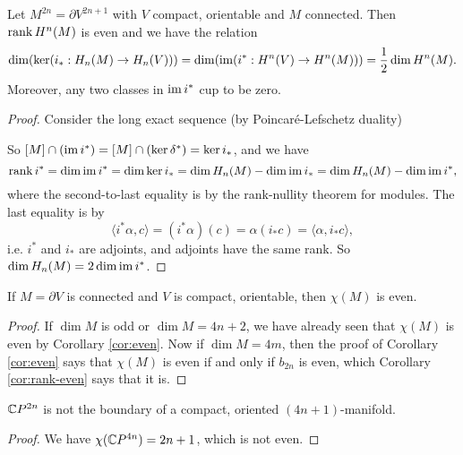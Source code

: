 \begin{corollary}\label{cor:rank-even}
  Let $M^{2n} = \partial V^{2n + 1}$ with
  $V$ compact, orientable and $M$ connected.
  Then $\operatorname{rank} H^n(M)$ is even and we have
  the relation
  \[
    \dim (\ker (i_* : H_n(M) \to H_n(V)))
    = \dim (\operatorname{im} (i^* : H^n(V) \to H^n(M)))
    = \frac{1}{2} \dim H^n(M).
  \]
  Moreover, any two classes in
  $\operatorname{im} i^*$ cup to be zero.
\end{corollary}

\begin{proof}
  Consider the long exact sequence (by
  Poincar\'e-Lefschetz duality)
  \begin{center}
  \end{center}
  So $[M] \cap (\operatorname{im} i^*) = [M] \cap (\ker \delta^*) = \ker i_*$, and we have
  \[
    \operatorname{rank} i^* = \dim \operatorname{im} i^*
    = \dim \ker i_*
    = \dim H_n(M) - \dim \operatorname{im} i_*
    = \dim H_n(M) - \dim \operatorname{im} i^*,
  \]
  where the second-to-last equality
  is by the rank-nullity theorem
  for modules. The last equality is by
  \[
    \langle i^* \alpha, c \rangle
    = (i^* \alpha)(c)
    = \alpha(i_* c)
    = \langle \alpha, i_* c \rangle,
  \]
  i.e. $i^*$ and $i_*$ are adjoints, and
  adjoints have the same rank. So
  $\dim H_n(M) = 2 \dim \operatorname{im} i^*$.
\end{proof}

\begin{corollary}
  If $M = \partial V$ is connected and
  $V$ is compact, orientable, then
  $\chi(M)$ is even.
\end{corollary}

\begin{proof}
  If $\dim M$ is odd or $\dim M = 4n + 2$, we have already
  seen that $\chi(M)$ is even by Corollary
  \ref{cor:even}.
  Now if $\dim M = 4m$, then the proof of
  Corollary \ref{cor:even} says that
  $\chi(M)$ is even if and only if
  $b_{2n}$ is even, which Corollary
  \ref{cor:rank-even} says that it is.
\end{proof}

\begin{corollary}
  $\mathbb{C} P^{2n}$ is not the boundary of a
  compact, oriented $(4n + 1)$-manifold.
\end{corollary}

\begin{proof}
  We have $\chi(\mathbb{C} P^{4n}) = 2n + 1$, which is
  not even.
\end{proof}
